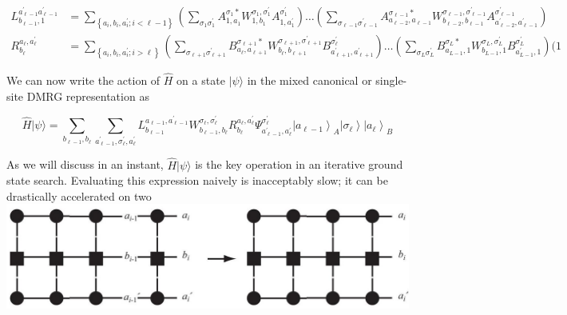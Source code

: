 \documentclass[12pt]{article}
\begin{document}
\begin{align*}
L_{b_{\ell-1}, 1}^{a_{\ell-1}^{\prime} a_{\ell-1}^{\prime}} & =\sum_{\left\{a_{i}, b_{i}, a_{i}^{\prime} ; i<\ell-1\right\}}\left(\sum_{\sigma_{1} \sigma_{1}^{\prime}} A_{1, a_{1}}^{\sigma_{1} *} W_{1, b_{1}}^{\sigma_{1}, \sigma_{1}^{\prime}} A_{1, a_{1}^{\prime}}^{\sigma_{1}^{\prime}}\right) \ldots\left(\sum_{\sigma_{\ell-1} \sigma_{\ell-1}^{\prime}} A_{a_{\ell-2}, a_{\ell-1}}^{\sigma_{\ell-1} *} W_{b_{\ell-2}, b_{\ell-1}}^{\sigma_{\ell-1}, \sigma_{\ell-1}^{\prime}} A_{a_{\ell-2}^{\prime}, a_{\ell-1}^{\prime}}^{\sigma_{\ell-1}^{\prime}}\right)  \tag{192}\\
R_{b_{\ell}}^{a_{\ell}, a_{\ell}^{\prime}} & =\sum_{\left\{a_{i}, b_{i}, a_{i}^{\prime} ; i>\ell\right\}}\left(\sum_{\sigma_{\ell+1} \sigma_{\ell+1}^{\prime}} B_{a_{\ell}, a_{\ell+1}}^{\sigma_{\ell+1} *} W_{b_{\ell}, b_{\ell+1}}^{\sigma_{\ell+1}, \sigma_{\ell+1}^{\prime}} B_{a_{\ell+1}^{\prime}, a_{\ell+1}^{\prime}}^{\sigma_{\ell}^{\prime}}\right) \ldots\left(\sum_{\sigma_{L} \sigma_{L}^{\prime}} B_{a_{L-1}, 1}^{\sigma_{L} *} W_{b_{L-1}, 1}^{\sigma_{L}, \sigma_{L}^{\prime}} B_{a_{L-1}^{\prime}, 1}^{\sigma_{L}^{\prime}}\right)(1 \tag{193}
\end{align*}


We can now write the action of $\hat{H}$ on a state $|\psi\rangle$ in the mixed canonical or single-site DMRG representation as


\begin{equation*}
\hat{H}|\psi\rangle=\sum_{b_{\ell-1}, b_{\ell}} \sum_{a_{\ell-1}^{\prime}, \sigma_{\ell}^{\prime}, a_{\ell}^{\prime}} L_{b_{\ell-1}}^{a_{\ell-1}, a_{\ell-1}^{\prime}} W_{b_{\ell-1}, b_{\ell}}^{\sigma_{\ell}, \sigma_{\ell}^{\prime}} R_{b_{\ell}}^{a_{\ell}, a_{\ell}^{\prime}} \Psi_{a_{\ell-1}^{\prime}, a_{\ell}^{\prime}}^{\sigma_{\ell}^{\prime}}\left|a_{\ell-1}\right\rangle_{A}\left|\sigma_{\ell}\right\rangle\left|a_{\ell}\right\rangle_{B} \tag{194}
\end{equation*}


As we will discuss in an instant, $\hat{H}|\psi\rangle$ is the key operation in an iterative ground state search. Evaluating this expression naively is inacceptably slow; it can be drastically accelerated on two\\
\includegraphics[max width=\textwidth, center]{2024_05_04_afc4ad226da9ccfe0ac8g-063}
\end{document}
